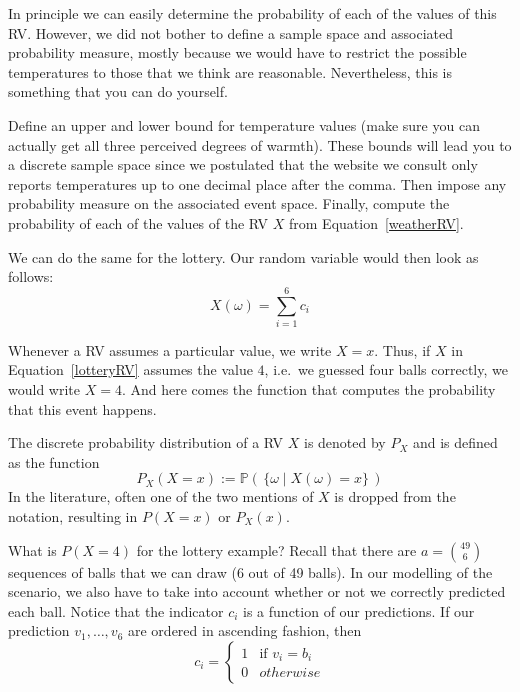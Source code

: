 In principle we can easily determine the probability of each of the values of this RV. However, we did
not bother to define a sample space and associated probability measure, mostly because we would have to
restrict the possible temperatures to those that we think are reasonable. Nevertheless, this is something
that you can do yourself.

\begin{Exercise}
Define an upper and lower bound for temperature values (make sure you can actually get all three perceived
degrees of warmth). These bounds will lead you to a discrete sample space since we postulated
that the website we consult only reports temperatures up to one decimal place after the comma. Then impose
any probability measure on the associated event space. Finally, compute the probability of each of the
values of the RV $ X $ from Equation~\eqref{weatherRV}.
\end{Exercise}

We can do the same for the lottery. Our random variable would then look as follows:
\begin{equation}\label{lotteryRV}
X(\omega) = \overset{6}{\underset{i=1}{\sum}} c_{i}
\end{equation}

Whenever a RV assumes a particular value, we write $ X=x $. Thus, if $ X $ in Equation~\eqref{lotteryRV} assumes the
value $ 4 $, i.e.\ we guessed four balls correctly, we would write $ X=4 $. And here comes the function
that computes the probability that this event happens.

\begin{Definition}
The discrete probability distribution of a RV $ X $ is denoted by
$P_X$ and is defined as the function
$$ P_X(X=x) := \mathbb{P}( \, \{\omega \mid X(\omega)=x\} \, ) $$
In the literature, often one of the two mentions of $X$ is dropped from the
notation, resulting in $P(X=x)$ or $P_X(x)$.
\end{Definition}

What is $ P(X=4) $ for the lottery example? Recall that there are 
$ a = \binom{49}{6} $ sequences of balls that we can draw (6 out of 49 balls).
In our modelling of the scenario, we also have to take
into account whether or not we correctly predicted each ball. Notice that the indicator $ c_{i} $ is a function of our predictions. 
If our prediction $ v_{1}, \ldots, v_{6} $ are ordered in ascending fashion, then
\begin{equation*}
c_{i} = 
\begin{cases}
1 & \mbox{if } v_{i} = b_{i} \\
0 & otherwise
\end{cases}
\end{equation*}

